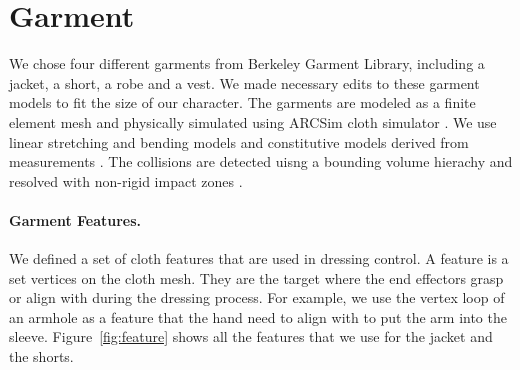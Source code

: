 \section{Garment}

We chose four different garments from Berkeley Garment Library, including a jacket, a short, a robe and a vest. We made necessary edits to these garment models to fit the size of our character.
The garments are modeled as a finite element mesh and physically simulated using ARCSim cloth simulator \cite{Narain:2012:AAR}. We use linear stretching and bending models and constitutive models derived from measurements \cite{Wang:2011}. The collisions are detected uisng a bounding volume hierachy \cite{Tang:2010} and resolved with non-rigid impact zones \cite{Harmon:2008}.

\paragraph{Garment Features.} We defined a set of cloth features that are used in dressing control. A feature is a set vertices on the cloth mesh. They are the target where the end effectors grasp or align with during the dressing process. For example, we use the vertex loop of an armhole as a feature that the hand need to align with to put the arm into the sleeve. Figure~\ref{fig:feature} shows all the features that we use for the jacket and the shorts.
